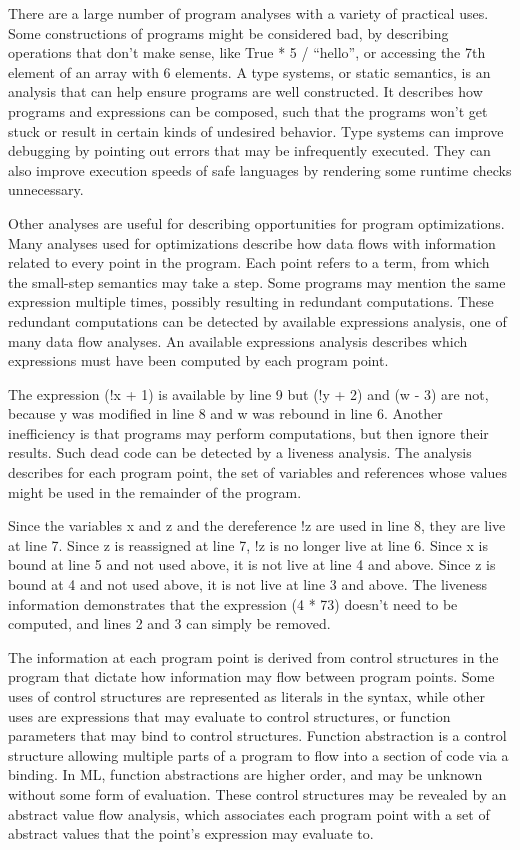 \documentclass{article}
\begin{document}
There are a large number of program analyses with a variety of practical uses.  Some
constructions of programs might be considered bad, by describing operations that don't make
sense, like True * 5 / “hello”, or accessing the 7th element of an array with 6 elements.  A
type systems, or static semantics, is an analysis that can help ensure programs are well
constructed.  It describes how programs and expressions can be composed, such that the programs
won't get stuck or result in certain kinds of undesired behavior.  Type systems can improve
debugging by pointing out errors that may be infrequently executed.  They can also improve
execution speeds of safe languages by rendering some runtime checks unnecessary.  

Other analyses are useful for describing opportunities for program optimizations.  Many
analyses used for optimizations describe how data flows with information related to every point
in the program.  Each point refers to a term, from which the small-step semantics may take a
step.  Some programs may mention the same expression multiple times, possibly resulting in
redundant computations.  These redundant computations can be detected by available expressions
analysis, one of many data flow analyses.  An available expressions analysis describes which
expressions must have been computed by each program point.

The expression (!x + 1) is available by line 9 but (!y + 2) and (w - 3) are not, because y was
modified in line 8 and w was rebound in line 6. Another inefficiency is that programs may
perform computations, but then ignore their results.  Such dead code can be detected by a
liveness analysis.  The analysis describes for each program point, the set of variables and
references whose values might be used in the remainder of the program.

Since the variables x and z and the dereference !z are used in line 8, they are live at line
7.  Since z is reassigned at line 7, !z is no longer live at line 6.  Since x is bound at line
5 and not used above, it is not live at line 4 and above.  Since z is bound at 4 and not used
above, it is not live at line 3 and above. The liveness information demonstrates that the
expression (4 * 73) doesn't need to be computed, and lines 2 and 3 can simply be removed.

The information at each program point is derived from control structures in the program that
dictate how information may flow between program points.  Some uses of control structures are
represented as literals in the syntax, while other uses are expressions that may evaluate to
control structures, or function parameters that may bind to control structures.  Function
abstraction is a control structure allowing multiple parts of a program to flow into a section
of code via a binding.  In ML, function abstractions are higher order, and may be unknown
without some form of evaluation.  These control structures may be revealed by an abstract value
flow analysis, which associates each program point with a set of abstract values that the
point's expression may evaluate to.
\end{document}
